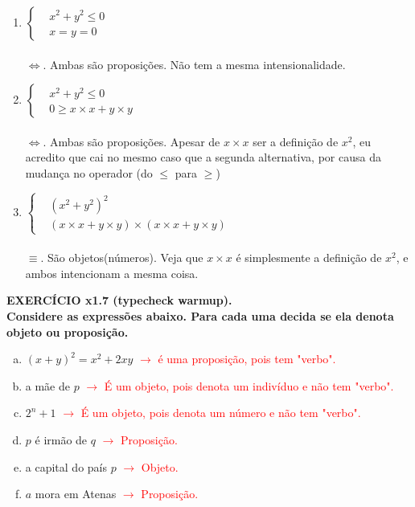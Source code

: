 \documentclass[a4paper, 12pt]{article}
\begin{document}
\begin{enumerate}
    \item $\left\{
    \begin{aligned}
    &x^{2} + y^{2} \leq 0\\
    &x=y=0
    \end{aligned}
    \right.$ \\ \\
    $\iff$. Ambas são proposições. Não tem a mesma intensionalidade. \\

    \item $\left\{
    \begin{aligned}
    &x^{2} + y^{2} \leq 0\\
    &0 \geq x \times x + y \times y
    \end{aligned}
    \right.$ \\ \\
    $\iff$. Ambas são proposições. Apesar de $x \times x$ ser a definição de $x^{2}$, eu acredito que cai no mesmo caso que a segunda alternativa, por causa da mudança no operador (do $\leq$ para $\geq$) \\

    \item $\left\{
    \begin{aligned}
    &(x^{2} + y^{2})^{2} \\
    &(x \times x + y \times y) \times (x \times x + y \times y)
    \end{aligned}
    \right.$ \\ \\
    $\equiv$. São objetos(números). Veja que $x \times x$ é simplesmente a definição de $x^{2}$, e ambos intencionam a mesma coisa. \\

\end{enumerate}

\noindent \textbf{EXERCÍCIO x1.7 (typecheck warmup). \\
Considere as expressões abaixo. Para cada uma decida se ela denota objeto ou proposição.}

\begin{enumerate}[(a)]
    \item $(x + y)^{2} = x^{2} + 2xy$ \textcolor{red}{$\rightarrow$ é uma proposição, pois tem "verbo".}
    \item a mãe de $p$ \textcolor{red}{$\rightarrow$ É um objeto, pois denota um indivíduo e não tem "verbo".}
    \item $2^{n} + 1$ \textcolor{red}{$\rightarrow$ É um objeto, pois denota um número e não tem "verbo".}
    \item $p$ é irmão de $q$ \textcolor{red}{$\rightarrow$ Proposição.}
    \item a capital do país $p$ \textcolor{red}{$\rightarrow$ Objeto.}
    \item $a$ mora em Atenas \textcolor{red}{$\rightarrow$ Proposição.} \\
\end{enumerate}
\end{document}
